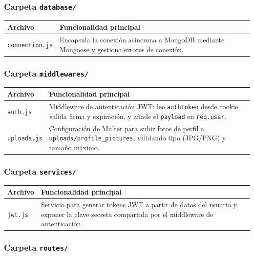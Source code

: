 \subsubsection{Carpeta \texttt{database/}}

\begin{longtable}{|p{3.8cm}|p{10.3cm}|}
\hline
\textbf{Archivo} & \textbf{Funcionalidad principal} \\
\hline
\texttt{connection.js} & Encapsula la conexión asíncrona a MongoDB mediante Mongoose y gestiona errores de conexión. \\
\hline
\end{longtable}

\subsubsection{Carpeta \texttt{middlewares/}}

\begin{longtable}{|p{3.8cm}|p{10.3cm}|}
\hline
\textbf{Archivo} & \textbf{Funcionalidad principal} \\
\hline
\texttt{auth.js} & Middleware de autenticación JWT: lee \texttt{authToken} desde cookie, valida firma y expiración, y añade el \texttt{payload} en \texttt{req.user}. \\
\hline
\texttt{uploads.js} & Configuración de Multer para subir fotos de perfil a \texttt{uploads/profile\_pictures}, validando tipo (JPG/PNG) y tamaño máximo. \\
\hline
\end{longtable}

\subsubsection{Carpeta \texttt{services/}}

\begin{longtable}{|p{3.8cm}|p{10.3cm}|}
\hline
\textbf{Archivo} & \textbf{Funcionalidad principal} \\
\hline
\texttt{jwt.js} & Servicio para generar tokens JWT a partir de datos del usuario y exponer la clave secreta compartida por el middleware de autenticación. \\
\hline
\end{longtable}

\subsubsection{Carpeta \texttt{routes/}}

